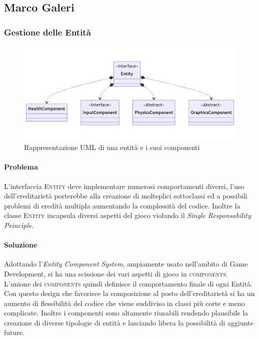 \documentclass[a4paper,12pt]{report}
\begin{document}
\subsection*{Marco Galeri}

\subsubsection{Gestione delle Entità}

\begin{figure}[H]
\centering
    \includegraphics[width=\textwidth,height=2\textheight,keepaspectratio]{img/EntityUML.png}
    \caption{Rappresentazione UML di una entità e i suoi componenti}
\end{figure}

\paragraph{Problema}
    L'interfaccia \textsc{Entity} deve implementare numerosi comportamenti diversi, l'uso dell'ereditarietà porterebbe alla creazione di molteplici sottoclassi ed a possibili problemi di eredità multipla aumentando la complessità del codice. Inoltre la classe \textsc{Entity} incapsula diversi aspetti del gioco violando il \textit{Single Responsability Principle}.

\paragraph{Soluzione}
    Adottando l'\textit{Entity Component System}, ampiamente usato nell'ambito di Game Development, si ha una scissione dei vari aspetti di gioco in \textsc{components}. L'unione dei \textsc{components} quindi definisce il comportamento finale di ogni Entità. Con questo design che favorisce la composizione al posto dell'ereditarietà si ha un aumento di flessibilità del codice che viene suddiviso in classi più corte e meno complicate. Inoltre i componenti sono altamente riusabili rendendo plausibile la creazione di diverse tipologie di entità e lasciando libera la possibilità di aggiunte future.
\end{document}
